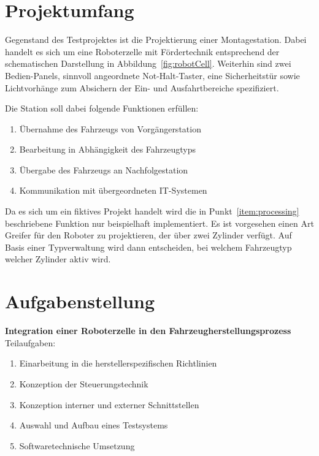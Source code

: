 \section{Projektumfang}
\label{sec:project_content}
Gegenstand des Testprojektes ist die Projektierung einer Montagestation. Dabei handelt es sich um eine Roboterzelle mit Fördertechnik entsprechend der schematischen Darstellung in Abbildung~\ref{fig:robotCell}.
Weiterhin sind zwei Bedien-Panels, sinnvoll angeordnete Not-Halt-Taster, eine Sicherheitstür sowie Lichtvorhänge zum Absichern der Ein- und Ausfahrtbereiche spezifiziert.

Die Station soll dabei folgende Funktionen erfüllen:
\begin{enumerate}
	\itemsep0.05em
	\item Übernahme des Fahrzeugs von Vorgängerstation
	\item \label{item:processing}Bearbeitung in Abhängigkeit des Fahrzeugtyps
	\item Übergabe des Fahrzeugs an Nachfolgestation
	\item Kommunikation mit übergeordneten IT-Systemen
\end{enumerate}

Da es sich um ein fiktives Projekt handelt wird die in Punkt~\ref{item:processing} beschriebene Funktion nur beispielhaft implementiert. Es ist vorgesehen einen Art Greifer für den Roboter zu projektieren, der über zwei Zylinder verfügt. Auf Basis einer Typverwaltung wird dann entscheiden, bei welchem Fahrzeugtyp welcher Zylinder aktiv wird.

\section{Aufgabenstellung}
\label{sec:task}

\textbf{Integration einer Roboterzelle in den Fahrzeugherstellungsprozess}\leer
Teilaufgaben:%
\begin{enumerate}
	\itemsep 0.05em
	\item Einarbeitung in die herstellerspezifischen Richtlinien
	\item Konzeption der Steuerungstechnik
	\item Konzeption interner und externer Schnittstellen
	\item Auswahl und Aufbau eines Testsystems
	\item Softwaretechnische Umsetzung
\end{enumerate}
